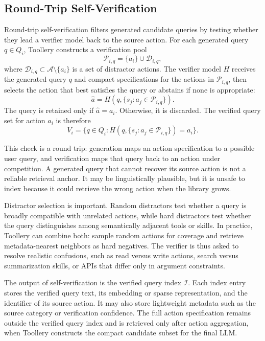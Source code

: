 \subsection{Round-Trip Self-Verification}
\label{sec:self_verification}

Round-trip self-verification filters generated candidate queries by testing whether they lead a verifier model back to the source action. For each generated query $q \in Q_i$, Toollery constructs a verification pool
\begin{equation}
    \mathcal{P}_{i,q} = \{a_i\} \cup \mathcal{D}_{i,q},
\end{equation}
where $\mathcal{D}_{i,q} \subset \mathcal{A} \setminus \{a_i\}$ is a set of distractor actions. The verifier model $H$ receives the generated query $q$ and compact specifications for the actions in $\mathcal{P}_{i,q}$, then selects the action that best satisfies the query or abstains if none is appropriate:
\begin{equation}
    \hat{a} = H(q, \{s_j : a_j \in \mathcal{P}_{i,q}\}).
\end{equation}
The query is retained only if $\hat{a} = a_i$. Otherwise, it is discarded. The verified query set for action $a_i$ is therefore
\begin{equation}
    V_i = \{q \in Q_i : H(q, \{s_j : a_j \in \mathcal{P}_{i,q}\}) = a_i\}.
\end{equation}

This check is a round trip: generation maps an action specification to a possible user query, and verification maps that query back to an action under competition. A generated query that cannot recover its source action is not a reliable retrieval anchor. It may be linguistically plausible, but it is unsafe to index because it could retrieve the wrong action when the library grows.

Distractor selection is important. Random distractors test whether a query is broadly compatible with unrelated actions, while hard distractors test whether the query distinguishes among semantically adjacent tools or skills. In practice, Toollery can combine both: sample random actions for coverage and retrieve metadata-nearest neighbors as hard negatives. The verifier is thus asked to resolve realistic confusions, such as read versus write actions, search versus summarization skills, or APIs that differ only in argument constraints.

The output of self-verification is the verified query index $\mathcal{I}$. Each index entry stores the verified query text, its embedding or sparse representation, and the identifier of its source action. It may also store lightweight metadata such as the source category or verification confidence. The full action specification remains outside the verified query index and is retrieved only after action aggregation, when Toollery constructs the compact candidate subset for the final LLM.

